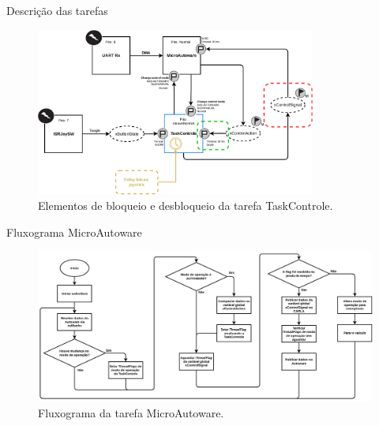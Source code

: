 \documentclass{if-beamer}
\begin{document}
\begin{frame}{Descrição das tarefas}
	
	\begin{figure}
		\centering
		\includegraphics[width = 0.82\textwidth]{img/taskcontrole_blockrelease}
		\caption{Elementos de bloqueio e desbloqueio da tarefa TaskControle.}
		\label{fig:taskcontrole_blockrelease}
	\end{figure}
	
\end{frame}


\begin{frame}{Fluxograma MicroAutoware}
	
	\begin{figure}[H]
		\centering
		\includegraphics[width = \textwidth]{img/fluxograma_microautoware}
		\caption{Fluxograma da tarefa MicroAutoware.}
		\label{fig:fluxograma_microautoware}
	\end{figure}
	
\end{frame}
\end{document}
